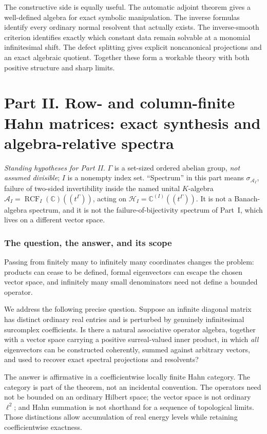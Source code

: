 \documentclass[11pt,a4paper]{article}
\numberwithin{equation}{section}
\theoremstyle{definition}
\theoremstyle{remark}
\newcommand{\C}{\mathbb C}
\newcommand{\K}{K}
\newcommand{\Hrf}{\mathcal H_I}
\newcommand{\Arf}{\mathcal A_I}
\newcommand{\RCF}{\operatorname{RCF}}
\begin{document}
The constructive side is equally useful. The automatic adjoint theorem gives
a well-defined algebra for exact symbolic manipulation. The inverse formulas
identify every ordinary normal resolvent that actually exists. The
inverse-smooth criterion identifies exactly which constant data remain
solvable at a monomial infinitesimal shift. The defect splitting gives
explicit noncanonical projections and an exact algebraic quotient. Together
these form a workable theory with both positive structure and sharp limits.

\clearpage
\part*{Part II. Row- and column-finite Hahn matrices: exact synthesis and algebra-relative spectra}

\emph{Standing hypotheses for Part II.} $\Gamma$ is a set-sized ordered
abelian group, \emph{not assumed divisible}; $I$ is a nonempty index set.
``Spectrum'' in this part means $\sigma_{\Arf}$, failure of two-sided
invertibility inside the named unital $\K$-algebra
$\Arf=\RCF_I(\C)((t^\Gamma))$, acting on $\Hrf=\C^{(I)}((t^\Gamma))$. It is
not a Banach-algebra spectrum, and it is not the failure-of-bijectivity
spectrum of Part~I, which lives on a different vector space.

\section{The question, the answer, and its scope}\label{ihs:rf:sec:question}

Passing from finitely many to infinitely many coordinates changes the
problem: products can cease to be defined, formal eigenvectors can escape the
chosen vector space, and infinitely many small denominators need not define
a bounded operator.

We address the following precise question. Suppose an infinite diagonal
matrix has distinct ordinary real entries and is perturbed by genuinely
infinitesimal surcomplex coefficients. Is there a natural associative
operator algebra, together with a vector space carrying a positive
surreal-valued inner product, in which \emph{all} eigenvectors can be
constructed coherently, summed against arbitrary vectors, and used to
recover exact spectral projections and resolvents?

The answer is affirmative in a coefficientwise locally finite Hahn category.
The category is part of the theorem, not an incidental convention. The
operators need not be bounded on an ordinary Hilbert space; the vector space
is not ordinary $\ell^2$; and Hahn summation is not shorthand for a sequence
of topological limits. Those distinctions allow accumulation of real energy
levels while retaining coefficientwise exactness.
\end{document}
